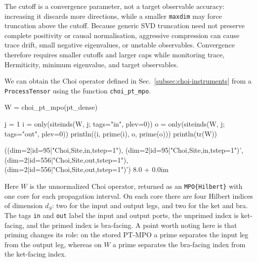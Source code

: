 The cutoff is a convergence parameter, not a target observable accuracy: increasing it discards more directions, while a smaller \texttt{maxdim} may force truncation above the cutoff.
Because generic SVD truncation need not preserve complete positivity or causal normalisation, aggressive compression can cause trace drift, small negative eigenvalues, or unstable observables.
Convergence therefore requires smaller cutoffs and larger caps while monitoring trace, Hermiticity, minimum eigenvalue, and target observables.

We can obtain the Choi operator defined in Sec.~\ref{subsec:choi-instruments} from a \texttt{ProcessTensor} using the function \texttt{choi\_pt\_mpo}.
%
\begin{julialistingpair}[
    caption={Choi MPO of the dense one-spin process tensor.}, label={lst:choi-pt-mpo},
    ]
%
    \begin{juliacode}[paired]
W = choi_pt_mpo(pt_dense)

j = 1
i = only(siteinds(W, j; tags="in", plev=0))
o = only(siteinds(W, j; tags="out", plev=0))
println((i, prime(i), o, prime(o)))
println(tr(W))
    \end{juliacode}
%
    \begin{juliaoutput}[paired]
((dim=2|id=95|"Choi,Site,in,tstep=1"), (dim=2|id=95|"Choi,Site,in,tstep=1")', (dim=2|id=556|"Choi,Site,out,tstep=1"), (dim=2|id=556|"Choi,Site,out,tstep=1")')
8.0 + 0.0im
    \end{juliaoutput}
%
\end{julialistingpair}
%
Here \(W\) is the unnormalized Choi operator, returned as an \texttt{MPO\{Hilbert\}} with one core for each propagation interval.
On each core there are four Hilbert indices of dimension \(d_S\): two for the input and output legs, and two for the ket and bra.
The tags \texttt{in} and \texttt{out} label the input and output ports, the unprimed index is ket-facing, and the primed index is bra-facing.
A point worth noting here is that priming changes its role: on the stored PT-MPO a prime separates the input leg from the output leg, whereas on \(W\) a prime separates the bra-facing index from the ket-facing index.
